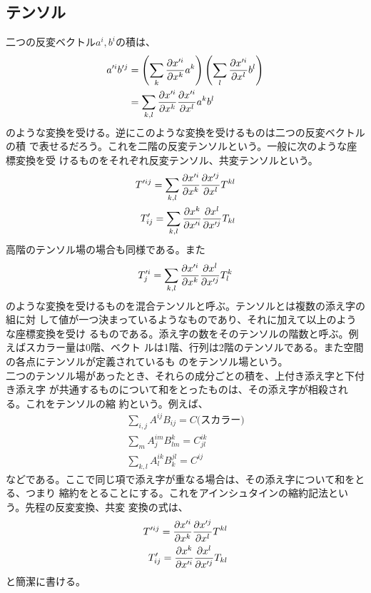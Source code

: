 \documentclass{jsarticle}
\begin{document}
        \subsection{テンソル}
            二つの反変ベクトル$a^i,b^i$の積は、
            \begin{align*}
                a'^ib'^j &= \lr{\sum_k \pd[x'^i]{x^k}a^k}
                \lr{\sum_l \pd[x'^i]{x^l}b^l}\\
                &= \sum_{k,l} \pd[x'^i]{x^k}\pd[x'^i]{x^l}a^kb^l
            \end{align*}
            のような変換を受ける。逆にこのような変換を受けるものは二つの反変ベクトルの積
            で表せるだろう。これを二階の反変テンソルという。一般に次のような座標変換を受
            けるものをそれぞれ反変テンソル、共変テンソルという。
            \begin{eqnarray*}
                T'^{ij} = \sum_{k,l}\pd[x'^i]{x^k}\pd[x'^j]{x^l}T^{kl}\\
                T'_{ij} = \sum_{k,l}\pd[x^k]{x'^i}\pd[x^l]{x'^j}T_{kl}
            \end{eqnarray*}
            高階のテンソル場の場合も同様である。また
                \[T'^i_j = \sum_{k,l}\pd[x'^i]{x^k}\pd[x^l]{x'^j}T^k_l\]
            のような変換を受けるものを混合テンソルと呼ぶ。テンソルとは複数の添え字の組に対
            して値が一つ決まっているようなものであり、それに加えて以上のような座標変換を受け
            るものである。添え字の数をそのテンソルの階数と呼ぶ。例えばスカラー量は0階、ベクト
            ルは1階、行列は2階のテンソルである。また空間の各点にテンソルが定義されているも
            のをテンソル場という。\\
        
            二つのテンソル場があったとき、それらの成分ごとの積を、上付き添え字と下付き添え字
            が共通するものについて和をとったものは、その添え字が相殺される。これをテンソルの縮
            約という。例えば、
            \begin{gather*}
                \sum_{i,j} A^{ij}B_{ij} = C\text{(スカラー)}\\
                \sum_m A^{im}_jB^k_{lm} = C^{ik}_{jl}\\
                \sum_{k,l} A^{ik}_lB^{jl}_k = C^{ij}
            \end{gather*}
            などである。ここで同じ項で添え字が重なる場合は、その添え字について和をとる、つまり
            縮約をとることにする。これをアインシュタインの縮約記法という。先程の反変変換、共変
            変換の式は、
            \begin{eqnarray*}
                T'^{ij} = \pd[x'^i]{x^k}\pd[x'^j]{x^l}T^{kl}\\
                T'_{ij} = \pd[x^k]{x'^i}\pd[x^l]{x'^j}T_{kl}
            \end{eqnarray*}
            と簡潔に書ける。
\end{document}
